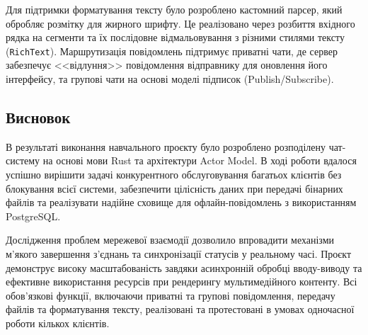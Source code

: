 \documentclass[14pt, a4paper]{extreport}
\begin{document}
	
	Для підтримки форматування тексту було розроблено кастомний парсер, який обробляє розмітку для жирного шрифту. Це реалізовано через розбиття вхідного рядка на сегменти та їх послідовне відмальовування з різними стилями тексту (\texttt{RichText}). Маршрутизація повідомлень підтримує приватні чати, де сервер забезпечує <<відлуння>> повідомлення відправнику для оновлення його інтерфейсу, та групові чати на основі моделі підписок (Publish/Subscribe).
	
	
	
	\subsection*{Висновок}
	
	В результаті виконання навчального проєкту було розроблено розподілену чат-систему на основі мови Rust та архітектури Actor Model. В ході роботи вдалося успішно вирішити задачі конкурентного обслуговування багатьох клієнтів без блокування всієї системи, забезпечити цілісність даних при передачі бінарних файлів та реалізувати надійне сховище для офлайн-повідомлень з використанням PostgreSQL. 
	
	Дослідження проблем мережевої взаємодії дозволило впровадити механізми м'якого завершення з'єднань та синхронізації статусів у реальному часі. Проєкт демонструє високу масштабованість завдяки асинхронній обробці вводу-виводу та ефективне використання ресурсів при рендерингу мультимедійного контенту. Всі обов'язкові функції, включаючи приватні та групові повідомлення, передачу файлів та форматування тексту, реалізовані та протестовані в умовах одночасної роботи кількох клієнтів.
\end{document}
